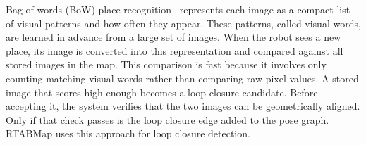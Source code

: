 Bag-of-words (BoW) place recognition~\cite{galvez2012bags} represents each
image as a compact list of visual patterns and how often they appear.
These patterns, called visual words, are learned in advance from a large
set of images.
When the robot sees a new place, its image is converted into this
representation and compared against all stored images in the map.
This comparison is fast because it involves only counting matching visual
words rather than comparing raw pixel values.
A stored image that scores high enough becomes a loop closure candidate.
Before accepting it, the system verifies that the two images can be
geometrically aligned.
Only if that check passes is the loop closure edge added to the pose graph.
RTABMap uses this approach for loop closure detection.

%
%

